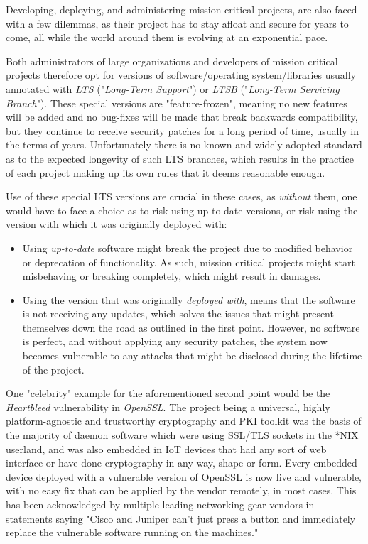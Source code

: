 \documentclass[a4paper,12pt]{article}
\begin{document}
	Developing, deploying, and administering mission critical projects, are also faced with a few dilemmas, as their project has to stay afloat and secure for years to come, all while the world around them is evolving at an exponential pace.
	
	Both administrators of large organizations and developers of mission critical projects therefore opt for versions of software/operating system/libraries usually annotated with \textit{LTS} ("\textit{Long-Term Support}") or \textit{LTSB} ("\textit{Long-Term Servicing Branch}"). These special versions are "feature-frozen", meaning no new features will be added and no bug-fixes will be made that break backwards compatibility, but they continue to receive security patches for a long period of time, usually in the terms of years. Unfortunately there is no known and widely adopted standard as to the expected longevity of such LTS branches, which results in the practice of each project making up its own rules that it deems reasonable enough.
	
	Use of these special LTS versions are crucial in these cases, as \textit{without} them, one would have to face a choice as to risk using up-to-date versions, or risk using the version with which it was originally deployed with:
	
	\vspace{-0.15in}
	\begin{itemize}
		\item Using \textit{up-to-date} software might break the project due to modified behavior or deprecation of functionality. As such, mission critical projects might start misbehaving or breaking completely, which might result in damages.
		\item Using the version that was originally \textit{deployed with}, means that the software is not receiving any updates, which solves the issues that might present themselves down the road as outlined in the first point. However, no software is perfect, and without applying any security patches, the system now becomes vulnerable to any attacks that might be disclosed during the lifetime of the project.
	\end{itemize}
	\vspace{-0.15in}
	
	One "celebrity" example for the aforementioned second point would be the \textit{Heartbleed} vulnerability in \textit{OpenSSL}. The project being a universal, highly platform-agnostic and trustworthy cryptography and PKI toolkit was the basis of the majority of daemon software which were using SSL/TLS sockets in the *NIX userland, and was also embedded in IoT devices that had any sort of web interface or have done cryptography in any way, shape or form. Every embedded device deployed with a vulnerable version of OpenSSL is now live and vulnerable, with no easy fix that can be applied by the vendor remotely, in most cases. This has been acknowledged by multiple leading networking gear vendors in statements saying "Cisco and Juniper can't just press a button and immediately replace the vulnerable software running on the machines."\cite{jpaglier14}
	
\end{document}
